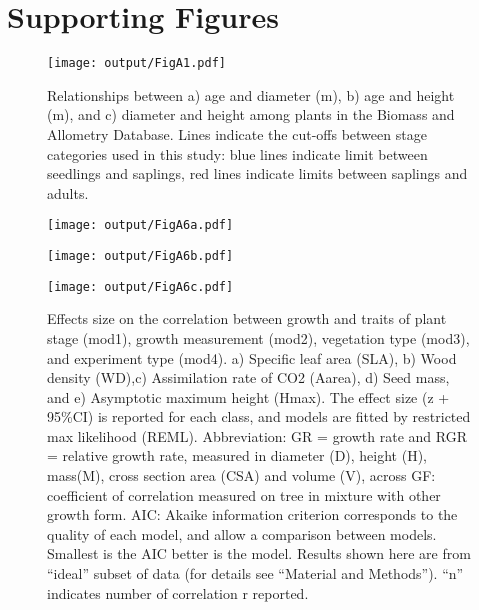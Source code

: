 \documentclass[10pt,twoside]{article}\usepackage[]{graphicx}\usepackage[]{color}
\date{}
\begin{document}
\maketitle

\tableofcontents

\renewcommand{\thefigure}{S\arabic{figure}}
\renewcommand{\thetable}{S\arabic{table}}

\section{Supporting Figures}\label{app:supp_info_figures}

\begin{figure}[h!]
\centering
\texttt{[image: output/FigA1.pdf]}
\caption{Relationships between a) age and diameter (m), b) age and height (m), and c) diameter and height among plants in the Biomass and Allometry Database. Lines indicate the cut-offs between stage categories used in this study: blue lines indicate limit between seedlings and saplings, red lines indicate limits between saplings and adults.}
\label{fig:figA1}
\end{figure}

\begin{figure}[h!]
\centering
\texttt{[image: output/FigA6a.pdf]}
\end{figure}

\begin{figure}[h!]
\centering
\texttt{[image: output/FigA6b.pdf]}
\end{figure}

\begin{figure}[h!]
\centering
\texttt{[image: output/FigA6c.pdf]}
\caption{Effects size on the correlation between growth and traits of plant stage (mod1), growth measurement (mod2), vegetation type (mod3), and experiment type (mod4). a) Specific leaf area (SLA), b) Wood density (WD),c) Assimilation rate of CO2 (Aarea), d) Seed mass, and e) Asymptotic maximum height (Hmax). The effect size (z + 95\%CI) is reported for each class, and models are fitted by restricted max likelihood (REML). Abbreviation: GR = growth rate and RGR = relative growth rate, measured in diameter (D), height (H), mass(M), cross section area (CSA) and volume (V), across GF: coefficient of correlation measured on tree in mixture with other growth form. AIC: Akaike information criterion corresponds to the quality of each model, and allow a comparison between models. Smallest is the AIC better is the model. Results shown here are from ``ideal'' subset of data (for details see ``Material and Methods''). ``n'' indicates number of correlation r reported.}
\label{fig:figA6}
\end{figure}
\end{document}
